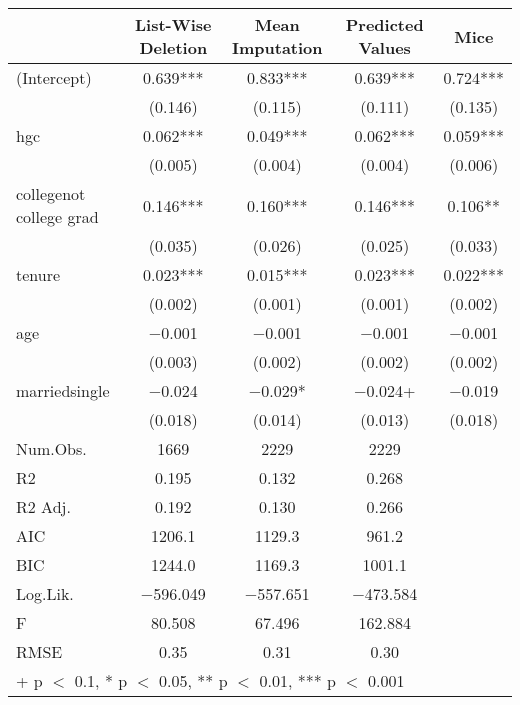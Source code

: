 \documentclass[12pt]{article}
\begin{document}
\begin{table}[H]
\begin{center}
\begin{tabular}[t]{lcccc}
\toprule
  & List-Wise Deletion & Mean Imputation & Predicted Values & Mice\\
\midrule
(Intercept) & \num{0.639}*** & \num{0.833}*** & \num{0.639}*** & \num{0.724}***\\
 & (\num{0.146}) & (\num{0.115}) & (\num{0.111}) & (\num{0.135})\\
hgc & \num{0.062}*** & \num{0.049}*** & \num{0.062}*** & \num{0.059}***\\
 & (\num{0.005}) & (\num{0.004}) & (\num{0.004}) & (\num{0.006})\\
collegenot college grad & \num{0.146}*** & \num{0.160}*** & \num{0.146}*** & \num{0.106}**\\
 & (\num{0.035}) & (\num{0.026}) & (\num{0.025}) & (\num{0.033})\\
tenure & \num{0.023}*** & \num{0.015}*** & \num{0.023}*** & \num{0.022}***\\
 & (\num{0.002}) & (\num{0.001}) & (\num{0.001}) & (\num{0.002})\\
age & \num{-0.001} & \num{-0.001} & \num{-0.001} & \num{-0.001}\\
 & (\num{0.003}) & (\num{0.002}) & (\num{0.002}) & (\num{0.002})\\
marriedsingle & \num{-0.024} & \num{-0.029}* & \num{-0.024}+ & \num{-0.019}\\
 & (\num{0.018}) & (\num{0.014}) & (\num{0.013}) & (\num{0.018})\\
\midrule
Num.Obs. & \num{1669} & \num{2229} & \num{2229} & \\
R2 & \num{0.195} & \num{0.132} & \num{0.268} & \\
R2 Adj. & \num{0.192} & \num{0.130} & \num{0.266} & \\
AIC & \num{1206.1} & \num{1129.3} & \num{961.2} & \\
BIC & \num{1244.0} & \num{1169.3} & \num{1001.1} & \\
Log.Lik. & \num{-596.049} & \num{-557.651} & \num{-473.584} & \\
F & \num{80.508} & \num{67.496} & \num{162.884} & \\
RMSE & \num{0.35} & \num{0.31} & \num{0.30} & \\
\bottomrule
\multicolumn{5}{l}{\rule{0pt}{1em}+ p $<$ 0.1, * p $<$ 0.05, ** p $<$ 0.01, *** p $<$ 0.001}\\
\end{tabular}
\end{center}
\end{table}
\end{document}
